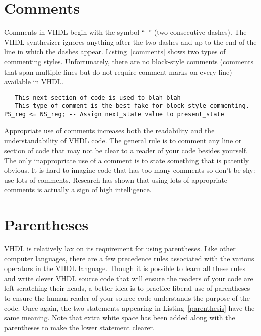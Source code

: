 \section{Comments}
Comments in VHDL begin with the symbol ``\texttt{--}'' (two consecutive dashes). The VHDL synthesizer ignores anything after the two dashes and up to the end of the line in which the dashes appear. Listing~\ref{comments} shows two types of commenting styles. Unfortunately, there are no block-style comments (comments that span multiple lines but do not require comment marks on every line) available in VHDL.

\noindent
\begin{minipage}{0.99\linewidth}
\begin{lstlisting}[label=comments, caption=Two typical uses of comments.]
-- This next section of code is used to blah-blah
-- This type of comment is the best fake for block-style commenting.
PS_reg <= NS_reg; -- Assign next_state value to present_state
\end{lstlisting}
\end{minipage}

Appropriate use of comments increases both the readability and the
understandability of VHDL code. The general rule is to comment any line or
section of code that may not be clear to a reader of your code besides
yourself. The only inappropriate use of a comment is to state something
that is patently obvious. It is hard to imagine code that has too many comments so don't be shy: use lots of comments. Research has shown that using lots of appropriate comments is actually a sign of high intelligence.

\section{Parentheses}
VHDL is relatively lax on its requirement for using parentheses. Like other computer languages, there are a few precedence rules associated with the various operators in the VHDL language. Though it is possible to learn all these rules and write clever VHDL source code that will ensure the readers of your code are left scratching their heads, a better idea is to practice liberal use of parentheses to ensure the human reader of your source code understands the purpose of the code. Once again, the two statements appearing in Listing~\ref{parenthesis} have the same meaning. Note that extra white space has been added along with the parentheses to make the lower statement clearer.

